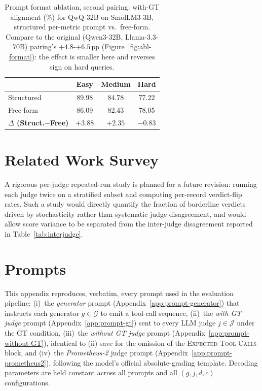\begin{table}[h!]
\centering
\small
\setlength{\tabcolsep}{4pt}
\renewcommand{\arraystretch}{1.05}
\begin{tabular}{@{}lccc@{}}
\toprule
 & \textbf{Easy} & \textbf{Medium} & \textbf{Hard} \\
\midrule
Structured & 89.98 & 84.78 & 77.22 \\
Free-form  & 86.09 & 82.43 & 78.05 \\
\midrule
\textbf{$\Delta$ (Struct.$-$Free)} & $+3.88$ & $+2.35$ & $-0.83$ \\
\bottomrule
\end{tabular}
\caption{Prompt format ablation, second pairing: with-GT alignment (\%) for QwQ-32B on SmolLM3-3B, structured per-metric prompt vs.\ free-form. Compare to the original (Qwen3-32B, Llama-3.3-70B) pairing's $+4.8$-$+6.5$\,pp (Figure~\ref{fig:abl-format}): the effect is smaller here and reverses sign on hard queries.}
\label{tab:app-abl-format-r2}
\end{table}

\section{Related Work Survey}
\label{app:relwork-table}
A rigorous per-judge repeated-run study is planned for a future revision: running each judge twice on a stratified subset and computing per-record verdict-flip rates. Such a study would directly quantify the fraction of borderline verdicts driven by stochasticity rather than systematic judge disagreement, and would allow score variance to be separated from the inter-judge disagreement reported in Table~\ref{tab:interjudge}.


\section{Prompts}
\label{app:prompts}
\label{app:judge-prompts}

This appendix reproduces, verbatim, every prompt used in the evaluation pipeline: (i)~the \emph{generator} prompt (Appendix~\ref{app:prompt-generator}) that instructs each generator $g \in \mathcal{G}$ to emit a tool-call sequence, (ii)~the \emph{with GT judge} prompt (Appendix~\ref{app:prompt-gt}) sent to every LLM judge $j \in \mathcal{J}$ under the GT condition, (iii)~the \emph{without GT judge} prompt (Appendix~\ref{app:prompt-without GT}), identical to (ii) save for the omission of the \textsc{Expected Tool Calls} block, and (iv)~the \emph{Prometheus-2} judge prompt (Appendix~\ref{app:prompt-prometheus2}), following the model's official absolute-grading template. Decoding parameters are held constant across all prompts and all $(g, j, d, c)$ configurations.

